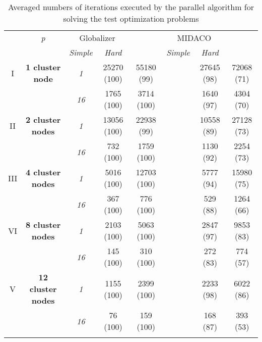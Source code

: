 \documentclass{svproc}
\begin{document}
\begin{Russian}
\begin{table}
  \centering
  \caption{Averaged numbers of iterations executed by the parallel algorithm for solving the test
optimization problems}
  \label{tab:iterations}
  \begin{tabular}{cccccccc}
    \cline{3-8}\noalign{\smallskip}
    \multicolumn{2}{c}{  } & \textit{p} & \multicolumn{2}{c}{Globalizer} & &
\multicolumn{2}{c}{MIDACO}   \\
    \noalign{\smallskip} \cline{4-5} \cline{7-8}  \noalign{\smallskip}
    \multicolumn{2}{c}{  } & & \textit{Simple} & \textit{Hard} & & \textit{Simple} &
\textit{Hard}  \\
    \noalign{\smallskip}\hline
    I & \textbf{1 cluster node}
      & \textit{1} &   25270 (100)  & 55180 (99) & & 27645 (98) & 72068 (71)  \\
    &  & \textit{16} & 1765 (100)  & 3714 (100) & &  1640 (97) & 4304 (70) \\
    \hline \noalign{\smallskip}
II  & \textbf{2 cluster nodes}  %
  & \textit{1} & 13056 (100) & 22938 (99) & & 10558 (89) & 27128 (73) \\
&   & \textit{16} & 732 (100) & 1759 (100)  &  & 1130 (92) & 2254 (73) \\
    \hline \noalign{\smallskip}
III & \textbf{4 cluster nodes} %
  & \textit{1}  & 5016 (100) & 12703 (100) & & 5777 (94) & 15980 (75) \\
& & \textit{16} & 367 (100) & 776 (100) & & 529 (88) &  1264 (66) \\
    \hline \noalign{\smallskip}
VI & \textbf{8 cluster nodes} %
  & \textit{1}  & 2103 (100) & 5063 (100) & & 2847 (97) & 9853 (83)\\
& & \textit{16} & 145 (100)  & 310 (100)  & & 272 (83) & 774 (57)\\
    \hline \noalign{\smallskip}
V & \textbf{12 cluster nodes} %
  & \textit{1}  & 1155 (100) & 2399 (100) & & 2233 (98) & 6022 (86) \\
& & \textit{16} & 76 (100)  & 159 (100)  & & 168 (87) & 393 (53)\\
    \noalign{\smallskip}\hline
  \end{tabular}
\end{table}


\end{Russian}
\end{document}
